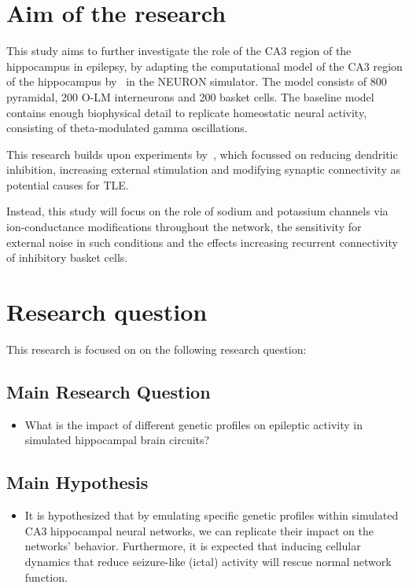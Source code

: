 \section{Aim of the research}
This study aims to further investigate the role of the CA3 region of the hippocampus in epilepsy,
by adapting the computational model of the CA3 region of the hippocampus by~\textcite{neymotinKetamineDisruptsTheta2011} in the NEURON simulator.
The model consists of 800 pyramidal, 200 O-LM interneurons and 200 basket cells.
The baseline model contains enough biophysical detail to replicate homeostatic neural activity, consisting of theta-modulated gamma oscillations.

This research builds upon experiments by~\textcite{sanjayImpairedDendriticInhibition2015},
which focussed on reducing dendritic inhibition, increasing external stimulation and modifying synaptic connectivity as potential causes for TLE\@.

Instead, this study will focus on the role of sodium and potassium channels via ion-conductance modifications throughout the network,
the sensitivity for external noise in such conditions and the effects increasing recurrent connectivity of inhibitory basket cells.
\pagebreak
\section{Research question}
This research is focused on on the following research question:

\subsection*{Main Research Question}

\begin{itemize}
    \item What is the impact of different genetic profiles on epileptic activity in simulated hippocampal brain circuits?
\end{itemize}

\subsection*{Main Hypothesis}

\begin{itemize}
    \item It is hypothesized that by emulating specific genetic profiles within simulated CA3 hippocampal neural networks,
          we can replicate their impact on the networks' behavior. Furthermore, it is expected that inducing cellular dynamics that
          reduce seizure-like (ictal) activity will rescue normal network function.
\end{itemize}


